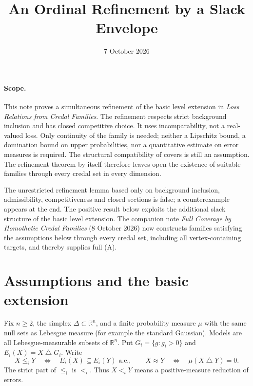 \documentclass[11pt]{article}
\title{An Ordinal Refinement by a Slack Envelope}
\author{}
\date{7 October 2026}
\theoremstyle{remark}
\newcommand{\R}{\mathbb R}
\newcommand{\sd}{\mathbin{\triangle}}
\begin{document}
\maketitle

\paragraph{Scope.}
This note proves a simultaneous refinement of the basic level extension in
\emph{Loss Relations from Credal Families}. The refinement respects strict
background inclusion and has closed competitive choice. It uses incomparability,
not a real-valued loss. Only continuity of the family is needed; neither a
Lipschitz bound, a domination bound on upper probabilities, nor a quantitative
estimate on error measures is required. The structural compatibility of covers
is still an assumption. The refinement theorem by itself therefore leaves open
the existence of suitable families through every credal set in every dimension.

The unrestricted refinement lemma based only on background inclusion,
admissibility, competitiveness and closed sections is false; a counterexample
appears at the end. The positive result below exploits the additional slack
structure of the basic level extension. The companion note
\emph{Full Coverage by Homothetic Credal Families} (8 October 2026) now
constructs families satisfying the assumptions below through every credal set,
including all vertex-containing targets, and thereby supplies full (A).

\section{Assumptions and the basic extension}

Fix $n\ge2$, the simplex $\Delta\subset\R^n$, and a finite probability measure
$\mu$ with the same null sets as Lebesgue measure (for example the standard
Gaussian). Models are all Lebesgue-measurable subsets of $\R^n$. Put
$G_i=\{g:g_i>0\}$ and $E_i(X)=X\sd G_i$. Write
\[
 X\le_iY\quad\Longleftrightarrow\quad
 E_i(X)\subseteq E_i(Y)\text{ a.e.},
 \qquad X\approx Y\quad\Longleftrightarrow\quad\mu(X\sd Y)=0.
\]
The strict part of $\le_i$ is $<_i$. Thus $X<_iY$ means a positive-measure
reduction of errors.
\end{document}
